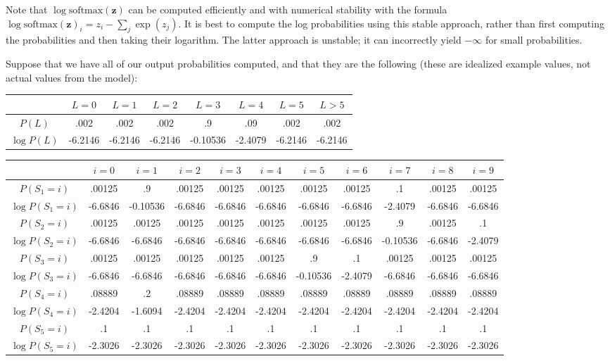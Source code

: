 \documentclass{article} \usepackage{comment}
\begin{document}
Note that $\log \text{softmax}( \mathbf{z})$ can be computed efficiently and
with numerical stability with the formula
$\log \text{softmax} (\mathbf{z} )_i = z_i - \sum_j \exp(z_j).$ It is best to
compute the log probabilities using this stable approach, rather than first
computing the probabilities and then taking their logarithm. The latter approach
is unstable; it can incorrectly yield $- \infty$ for small probabilities.

Suppose that we have all of our output probabilities computed, and that they
are the following (these are idealized example values, not actual values from the model):

\begin{tabular} {c|c|c|c|c|c|c|c}
& $L=0$ & $L=1$ & $L=2$ & $L=3$ & $L =4$ & $L = 5$ & $L > 5$ \\
\hline
$P(L)$ & .002 & .002 & .002 & .9 & .09 & .002 & .002 \\
\hline
$\log P(L)$ & -6.2146 & -6.2146 & -6.2146 & -0.10536 & -2.4079 & -6.2146 & -6.2146
\end{tabular}

{\tiny
\begin{tabular} {c|c|c|c|c|c|c|c|c|c|c}
& $i=0$ & $i=1$ & $i=2$ & $i=3$ & $i=4$ & $i=5$ & $i=6$ & $i=7$ & $i=8$ & $i=9$ \\
\hline
$P( S_1 = i)$ & .00125 & .9 & .00125 & .00125 & .00125 & .00125 & .00125 & .1 & .00125 & .00125 \\
\hline
$\log P( S_1 = i)$ & -6.6846 & -0.10536 & -6.6846 & -6.6846 & -6.6846 & -6.6846 & -6.6846 & -2.4079 & -6.6846 & -6.6846 \\
\hline
$P( S_2 = i)$      & .00125  & .00125   & .00125  & .00125  & .00125  & .00125  & .00125  & .9 & .00125 & .1 \\
\hline
$\log P( S_2 = i)$ & -6.6846 & -6.6846 & -6.6846 & -6.6846 & -6.6846 & -6.6846 & -6.6846 & -0.10536 & -6.6846 & -2.4079 \\
\hline
$P( S_3 = i)$     & .00125   & .00125  & .00125  & .00125  & .00125  & .9     & .1       & .00125   & .00125 & .00125 \\
\hline
$\log P( S_3 = i)$ & -6.6846 & -6.6846 & -6.6846 & -6.6846 & -6.6846 & -0.10536 & -2.4079 & -6.6846 & -6.6846 & -6.6846 \\
\hline
$P( S_4 = i)$ & .08889 & .2 & .08889 & .08889 & .08889 & .08889 & .08889 & .08889 & .08889 & .08889 \\
\hline
$\log P(S_4 = i) $ & -2.4204 & -1.6094  & -2.4204  & -2.4204  & -2.4204  & -2.4204  & -2.4204  & -2.4204  & -2.4204  & -2.4204 \\
\hline
$P( S_5 = i)$ & .1 & .1 & .1 & .1 & .1 & .1 & .1 & .1 & .1 & .1 \\
\hline
$\log P( S_5 = i)$ & -2.3026 & -2.3026 & -2.3026 & -2.3026 & -2.3026 & -2.3026 & -2.3026 & -2.3026 & -2.3026 & -2.3026
\end{tabular}
}
\end{document}
